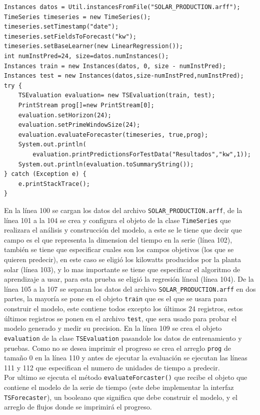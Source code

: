 \begin{lstlisting}[frame=single]  
Instances datos = Util.instancesFromFile("SOLAR_PRODUCTION.arff");
TimeSeries timeseries = new TimeSeries();
timeseries.setTimestamp("date");
timeseries.setFieldsToForecast("kw");
timeseries.setBaseLearner(new LinearRegression());
int numInstPred=24, size=datos.numInstances();
Instances train = new Instances(datos, 0, size - numInstPred);
Instances test = new Instances(datos,size-numInstPred,numInstPred);
try {
	TSEvaluation evaluation= new TSEvaluation(train, test);		
	PrintStream prog[]=new PrintStream[0];
	evaluation.setHorizon(24);
	evaluation.setPrimeWindowSize(24);
	evaluation.evaluateForecaster(timeseries, true,prog);
	System.out.println(
		evaluation.printPredictionsForTestData("Resultados","kw",1));
	System.out.println(evaluation.toSummaryString());
} catch (Exception e) {
	e.printStackTrace();
}
\end{lstlisting}
En la línea 100 se cargan los datos del archivo \texttt{SOLAR\_PRODUCTION.arff}, de la línea 101 a la 104 se crea y configura el objeto de la clase \texttt{TimeSeries} que realizara el análisis y construcción del modelo, a este se le tiene que decir que campo es el que representa la dimension del tiempo en la serie (línea 102), también se tiene que especificar cuales son los campos objetivos (los que se quieren predecir), en este caso se eligió los kilowatts producidos por la planta solar (línea 103), y lo mas importante se tiene que especificar el algoritmo de aprendizaje a usar, para esta prueba se eligió la regresión líneal (línea 104).
De la línea 105 a la 107 se separan los datos del archivo \texttt{SOLAR\_PRODUCTION.arff} en dos partes, la mayoría se pone en el objeto \texttt{train} que es el que se usara para construir el modelo, este contiene todos excepto los últimos 24 registros, estos últimos registros se ponen en el archivo \texttt{test}, que sera usado para probar el modelo generado y medir su precision.
En la línea 109 se crea el objeto \texttt{evaluation} de la clase \texttt{TSEvaluation} pasandole los datos de entrenamiento y pruebas. Como no se desea imprimir el progreso se crea el arreglo \texttt{prog} de tamaño 0 en la línea 110 y  antes de ejecutar la evaluación se ejecutan las líneas 111 y 112 que especifican el numero de unidades de tiempo a predecir.
\\Por ultimo se ejecuta el método \texttt{evaluateForcaster()} que recibe el objeto que contiene el modelo de la serie de tiempo (este debe implementar la interfaz \texttt{TSForecaster}), un booleano que significa que debe construir el modelo, y el arreglo de flujos donde se imprimirá el progreso. 
